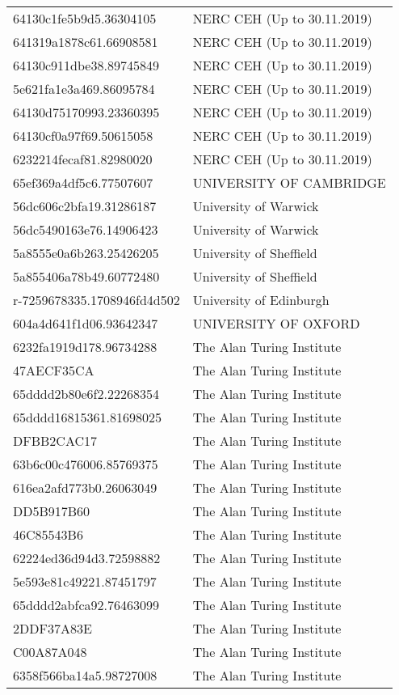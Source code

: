 \begin{tabular}{ll}
64130c1fe5b9d5.36304105 & NERC CEH (Up to 30.11.2019) \\
641319a1878c61.66908581 & NERC CEH (Up to 30.11.2019) \\
64130c911dbe38.89745849 & NERC CEH (Up to 30.11.2019) \\
5e621fa1e3a469.86095784 & NERC CEH (Up to 30.11.2019) \\
64130d75170993.23360395 & NERC CEH (Up to 30.11.2019) \\
64130cf0a97f69.50615058 & NERC CEH (Up to 30.11.2019) \\
6232214fecaf81.82980020 & NERC CEH (Up to 30.11.2019) \\
65ef369a4df5c6.77507607 & UNIVERSITY OF CAMBRIDGE \\
56dc606c2bfa19.31286187 & University of Warwick \\
56dc5490163e76.14906423 & University of Warwick \\
5a8555e0a6b263.25426205 & University of Sheffield \\
5a855406a78b49.60772480 & University of Sheffield \\
r-7259678335.1708946fd4d502 & University of Edinburgh \\
604a4d641f1d06.93642347 & UNIVERSITY OF OXFORD \\
6232fa1919d178.96734288 & The Alan Turing Institute \\
47AECF35CA & The Alan Turing Institute \\
65dddd2b80e6f2.22268354 & The Alan Turing Institute \\
65dddd16815361.81698025 & The Alan Turing Institute \\
DFBB2CAC17 & The Alan Turing Institute \\
63b6c00c476006.85769375 & The Alan Turing Institute \\
616ea2afd773b0.26063049 & The Alan Turing Institute \\
DD5B917B60 & The Alan Turing Institute \\
46C85543B6 & The Alan Turing Institute \\
62224ed36d94d3.72598882 & The Alan Turing Institute \\
5e593e81c49221.87451797 & The Alan Turing Institute \\
65dddd2abfca92.76463099 & The Alan Turing Institute \\
2DDF37A83E & The Alan Turing Institute \\
C00A87A048 & The Alan Turing Institute \\
6358f566ba14a5.98727008 & The Alan Turing Institute \\

\end{tabular}

